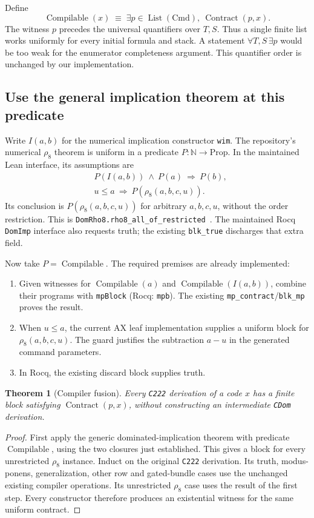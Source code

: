 \documentclass[11pt]{article}
\newtheorem{theorem}{Theorem}[section]
\theoremstyle{definition}\newtheorem{definition}[theorem]{Definition}
\newcommand{\Comp}{\operatorname{Compilable}}
\newcommand{\ctr}{\operatorname{Contract}}
\newcommand{\code}[1]{\texttt{#1}}
\begin{document}
Define
\[
  \Comp(x)\;\equiv\;\exists p\in\operatorname{List}(\mathrm{Cmd}),\ \ctr(p,x).
\]
The witness \(p\) precedes the universal quantifiers over \(T,S\). Thus a single
finite list works uniformly for every initial formula and stack. A statement
\(\forall T,S\,\exists p\) would be too weak for the enumerator completeness
argument. This quantifier order is unchanged by our implementation.

\subsection{Use the general implication theorem at this predicate}

Write \(I(a,b)\) for the numerical implication constructor \code{wim}. The
repository's numerical \(\rho_8\) theorem is uniform in a predicate
\(P:\mathbb N\to\mathrm{Prop}\). In the maintained Lean interface, its
assumptions are
\begin{align*}
 &P(I(a,b))\ \land\ P(a)\ \Longrightarrow\ P(b),\\
 &u\le a\ \Longrightarrow\ P(\rho_8(a,b,c,u)).
\end{align*}
Its conclusion is \(P(\rho_8(a,b,c,u))\) for arbitrary \(a,b,c,u\), without the
order restriction. This is \code{DomRho8.rho8\_all\_of\_restricted}~\cite{domrho}.
The maintained Rocq \code{DomImp} interface also requests truth; the existing
\code{blk\_true} discharges that extra field.

Now take \(P=\Comp\). The required premises are already implemented:
\begin{enumerate}
\item Given witnesses for \(\Comp(a)\) and \(\Comp(I(a,b))\), combine their
programs with \code{mpBlock} (Rocq: \code{mpb}). The existing
\code{mp\_contract}/\code{blk\_mp} proves the result.
\item When \(u\le a\), the current AX leaf implementation supplies a uniform
block for \(\rho_8(a,b,c,u)\). The guard justifies the subtraction \(a-u\)
in the generated command parameters.
\item In Rocq, the existing discard block supplies truth.
\end{enumerate}

\begin{theorem}[Compiler fusion]
Every \code{C222} derivation of a code \(x\) has a finite block satisfying
\(\ctr(p,x)\), without constructing an intermediate \code{CDom} derivation.
\end{theorem}
\begin{proof}
First apply the generic dominated-implication theorem with predicate
\(\Comp\), using the two closures just established. This gives a block for
every unrestricted \(\rho_8\) instance. Induct on the original \code{C222}
derivation. Its truth, modus-ponens, generalization, other row and gated-bundle
cases use the unchanged existing compiler operations. Its unrestricted
\(\rho_8\) case uses the result of the first step. Every constructor therefore
produces an existential witness for the same uniform contract.
\end{proof}
\end{document}
